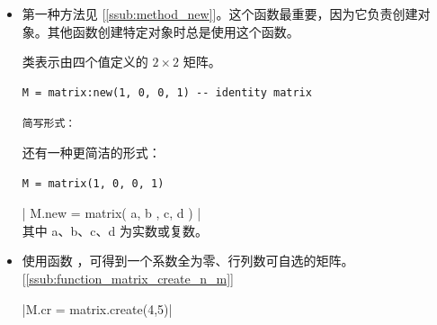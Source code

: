 \begin{itemize}

\item  第一种方法见 [\ref{ssub:method_new}]。这个函数最重要，因为它负责创建对象。其他函数创建特定对象时总是使用这个函数。

 类表示由四个值定义的 $2\times2$ 矩阵。

\begin{mybox}
\begin{verbatim}
M = matrix:new(1, 0, 0, 1) -- identity matrix
\end{verbatim}
\end{mybox}

\texttt{简写形式：}

还有一种更简洁的形式：

\begin{mybox}
\begin{verbatim}
M = matrix(1, 0, 0, 1)
\end{verbatim}
\end{mybox}


\begin{mybox}
   | M.new = matrix({ { a, b }, { c, d } }) | \\
   其中 a、b、c、d 为实数或复数。
\end{mybox}

\begin{minipage}{.3\textwidth}
\end{minipage}
\begin{minipage}{.6\textwidth}
\begin{tkzexample}
\end{tkzexample}
\end{minipage}


\item 使用函数 ，可得到一个系数全为零、行列数可自选的矩阵。[\ref{ssub:function_matrix_create_n_m}]

  \begin{mybox}
  |M.cr = matrix.create(4,5)|
  \end{mybox}

\begin{tkzexample}[latex=.5\textwidth]
\end{tkzexample}



\end{itemize}
